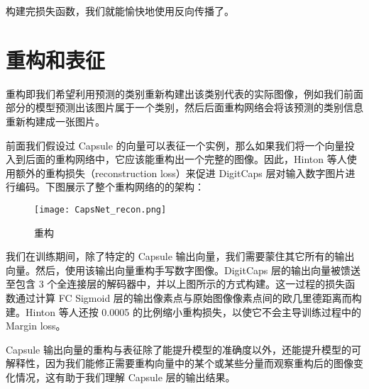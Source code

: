 构建完损失函数，我们就能愉快地使用反向传播了。
\section{重构和表征}
重构即我们希望利用预测的类别重新构建出该类别代表的实际图像，例如我们前面部分的模型预测出该图片属于一个类别，然后后面重构网络会将该预测的类别信息重新构建成一张图片。

前面我们假设过 Capsule 的向量可以表征一个实例，那么如果我们将一个向量投入到后面的重构网络中，它应该能重构出一个完整的图像。因此，Hinton 等人使用额外的重构损失（reconstruction loss）来促进 DigitCaps 层对输入数字图片进行编码。下图展示了整个重构网络的的架构：
\begin{figure}[H]
	\centering 
	\texttt{[image: CapsNet\_recon.png]}
	\caption{重构}
	\label{fig:4}
\end{figure}
我们在训练期间，除了特定的 Capsule 输出向量，我们需要蒙住其它所有的输出向量。然后，使用该输出向量重构手写数字图像。DigitCaps 层的输出向量被馈送至包含 3 个全连接层的解码器中，并以上图所示的方式构建。这一过程的损失函数通过计算 FC Sigmoid 层的输出像素点与原始图像像素点间的欧几里德距离而构建。Hinton 等人还按 0.0005 的比例缩小重构损失，以使它不会主导训练过程中的 Margin loss。

Capsule 输出向量的重构与表征除了能提升模型的准确度以外，还能提升模型的可解释性，因为我们能修正需要重构向量中的某个或某些分量而观察重构后的图像变化情况，这有助于我们理解 Capsule 层的输出结果。
